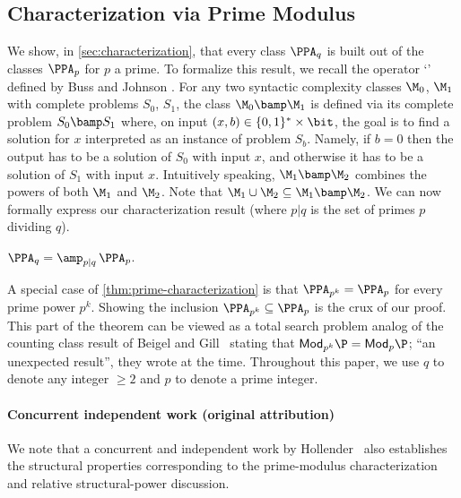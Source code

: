 \setcounter{section}{1}
\setcounter{subsection}{0}
\setcounter{theorem}{0}
\setcounter{figure}{1}
\subsection{Characterization via Prime Modulus} \label{sec:intro-char}

  We show, in \autoref{sec:characterization}, that every class $\PPA_q$ is built
out of the classes $\PPA_p$ for $p$ a prime. To formalize this result, we
recall the operator `\amp' defined by Buss and
Johnson \cite[\S6]{r13}. For any two syntactic complexity
classes $\M_0$, $\M_1$ with complete problems $S_0$, $S_1$, the class
$\M_0 \bamp \M_1$ is defined via its complete problem $S_0 \bamp S_1$ where, on
input $(x, b) \in \{0, 1\}^* \times \bit$, the goal is to find a solution for
$x$ interpreted as an instance of problem $S_b$. Namely, if $b = 0$ then the output has to be a solution of $S_0$ with
input $x$, and otherwise it has to be a solution of $S_1$ with input $x$.
Intuitively speaking, $\M_1 \bamp \M_2$ combines
the powers of both $\M_1$ and $\M_2$. Note that
$\M_1 \cup \M_2 \subseteq \M_1 \bamp \M_2$. We can now formally
express our characterization result (where $p|q$ is the set of primes $p$
dividing $q$).

\begin{theorem}\label{thm:prime-characterization}
$\PPA_q = \amp_{p|q}\, \PPA_p$.
\end{theorem}

\noindent A special case of \autoref{thm:prime-characterization} is that
$\PPA_{p^k}=\PPA_p$ for every prime power $p^k$. Showing the inclusion
$\PPA_{p^k}\subseteq \PPA_p$ is the crux of our proof. This part of the theorem can be viewed as a total search problem
analog of the counting class result of Beigel and Gill~\cite{r7}
stating that $\mathsf{Mod}_{p^k}\P = \mathsf{Mod}_{p}\P$; ``an unexpected
result'', they wrote at the time. Throughout this paper, we use $q$ to denote any integer $\ge 2$ and $p$ to denote a prime integer.

\paragraph{Concurrent independent work (original attribution)}
We note that a concurrent and independent work by Hollender~\cite{r25} also establishes the structural properties corresponding to the prime-modulus characterization and relative structural-power discussion.
